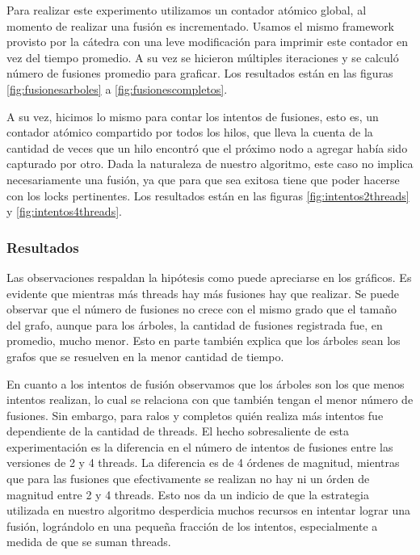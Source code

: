 Para realizar este experimento utilizamos un contador atómico global, al 
momento de realizar una fusión es incrementado. Usamos el mismo framework 
provisto por la cátedra con una leve modificación para imprimir este contador 
en vez del tiempo promedio. A su vez se hicieron múltiples iteraciones y se 
calculó número de fusiones promedio para graficar. Los resultados están en 
las figuras \ref{fig:fusionesarboles} a \ref{fig:fusionescompletos}.

A su vez, hicimos lo mismo para contar los intentos de fusiones, esto es, 
un contador atómico compartido por todos los hilos, que lleva la cuenta de 
la cantidad de veces que un hilo encontró que el próximo nodo a agregar había 
sido capturado por otro. Dada la naturaleza de nuestro algoritmo, este caso no 
implica necesariamente una fusión, ya que para que sea exitosa tiene que poder 
hacerse con los locks pertinentes. Los resultados están en 
las figuras \ref{fig:intentos2threads} y \ref{fig:intentos4threads}.

\subsubsection{Resultados}

Las observaciones respaldan la hipótesis como puede apreciarse en los gráficos.
 Es evidente que mientras más threads hay más fusiones hay que realizar. Se 
puede observar que el número de fusiones no crece con el mismo grado que el tamaño 
del grafo, aunque para los árboles, la cantidad de fusiones registrada fue, 
en promedio, mucho menor. Esto en parte también explica que los árboles sean 
los grafos que se resuelven en la menor cantidad de tiempo.

En cuanto a los intentos de fusión observamos que los árboles son los que menos 
intentos realizan, lo cual se relaciona con que también tengan el menor número 
de fusiones. Sin embargo, para ralos y completos quién realiza más intentos 
fue dependiente de la cantidad de threads. El hecho sobresaliente de esta 
experimentación es la diferencia en el número de intentos de fusiones entre 
las versiones de 2 y 4 threads. La diferencia es de 4 órdenes de magnitud, 
mientras que para las fusiones que efectivamente se realizan no hay ni un 
órden de magnitud entre 2 y 4 threads. Esto nos da un indicio de que la estrategia
 utilizada en nuestro algoritmo desperdicia muchos recursos en intentar lograr 
una fusión, lográndolo en una pequeña fracción de los intentos, especialmente 
a medida de que se suman threads.


